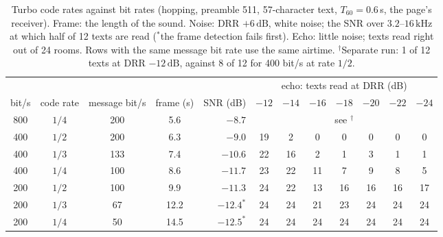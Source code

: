 \documentclass[11pt,a4paper]{article}
\newcommand{\kHz}{\,\mathrm{kHz}}
\newcommand{\dB}{\,\mathrm{dB}}
\theoremstyle{remark}
\begin{document}
\begin{table}[ht]
\centering
\caption{Turbo code rates against bit rates (hopping, preamble 511, 57-character text, $T_{60} = 0.6$\,s, the page's receiver). Frame: the length of the sound. Noise: DRR $+6\dB$, white noise; the SNR over $3.2$--$16\kHz$ at which half of 12 texts are read ($^{\ast}$the frame detection fails first). Echo: little noise; texts read right out of 24 rooms. Rows with the same message bit rate use the same airtime. $^{\dagger}$Separate run: 1 of 12 texts at DRR $-12\dB$, against 8 of 12 for 400 bit/s at rate $1/2$.}
\label{tab:rates}
\small
\setlength{\tabcolsep}{4.5pt}
\begin{tabular}{ccccrccccccc}
\toprule
& & & & & \multicolumn{7}{c}{echo: texts read at DRR (dB)}\\
\cmidrule(lr){6-12}
bit/s & code rate & message bit/s & frame (s) & SNR (dB) & $-12$ & $-14$ & $-16$ & $-18$ & $-20$ & $-22$ & $-24$\\
\midrule
800 & $1/4$ & 200 & 5.6 & $-8.7$ & \multicolumn{7}{c}{see $^{\dagger}$}\\
400 & $1/2$ & 200 & 6.3 & $-9.0$ & 19 & 2 & 0 & 0 & 0 & 0 & 0\\
400 & $1/3$ & 133 & 7.4 & $-10.6$ & 22 & 16 & 2 & 1 & 3 & 1 & 1\\
400 & $1/4$ & 100 & 8.6 & $-11.7$ & 23 & 22 & 11 & 7 & 9 & 8 & 5\\
200 & $1/2$ & 100 & 9.9 & $-11.3$ & 24 & 22 & 13 & 16 & 16 & 16 & 17\\
200 & $1/3$ & 67 & 12.2 & $-12.4^{\ast}$ & 24 & 24 & 21 & 23 & 24 & 24 & 24\\
200 & $1/4$ & 50 & 14.5 & $-12.5^{\ast}$ & 24 & 24 & 24 & 24 & 24 & 24 & 24\\
\bottomrule
\end{tabular}
\end{table}
\end{document}
